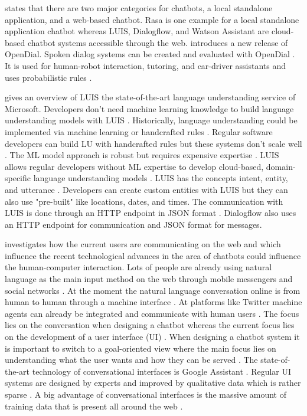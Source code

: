 \citet{kane2016role} states that there are two major categories for chatbots, a local standalone application, 
and a web-based chatbot. Rasa is one example for a local standalone application chatbot whereas LUIS, 
Dialogflow, and Watson Assistant are cloud-based chatbot systems accessible through the web.
\citet{lison2016opendial} introduces a new release of OpenDial. Spoken dialog systems can be 
created and evaluated with OpenDial \cite{lison2016opendial}. It is used for human-robot interaction, 
tutoring, and car-driver assistants and uses probabilistic rules \cite{lison2016opendial}.

\citet{luis2015williams} gives an overview of LUIS the state-of-the-art language understanding service of Microsoft.
Developers don't need machine learning knowledge to build language understanding models with LUIS \cite{luis2015williams}.
Historically, language understanding could be implemented via machine learning or handcrafted rules \cite{luis2015williams}.
Regular software developers can build LU with handcrafted rules but these systems don't scale well \cite{luis2015williams}.
The ML model approach is robust but requires expensive expertise \cite{luis2015williams}. 
LUIS allows regular developers without ML expertise to develop cloud-based, domain-specific language 
understanding models \cite{luis2015williams}.
LUIS has the concepts intent, entity, and utterance \cite{luis2015williams}.
Developers can create custom entities with LUIS but they can also use "pre-built" like locations, dates, and times.
The communication with LUIS is done through an HTTP endpoint in JSON format \cite{luis2015williams}. 
Dialogflow also uses an HTTP endpoint for communication and JSON format for messages. 

\citet{folstad2017chatbots} investigates how the current users are communicating on the web and which influence 
the recent technological advances in the area of chatbots could influence the human-computer interaction.
Lots of people are already using natural language as the main input method on the web through mobile messengers 
and social networks \cite{folstad2017chatbots}. At the moment the natural language conversation online is from 
human to human through a machine interface \cite{folstad2017chatbots}. 
At platforms like Twitter machine agents can already be integrated and communicate with human users \cite{folstad2017chatbots}. 
The focus lies on the conversation when designing a chatbot whereas the current focus lies on the 
development of a user interface (UI) \cite{folstad2017chatbots}.
When designing a chatbot system it is important to switch to a goal-oriented view where the main focus 
lies on understanding what the user wants and how they can be served \cite{folstad2017chatbots}.
The state-of-the-art technology of conversational interfaces is Google Assistant \cite{folstad2017chatbots}.
Regular UI systems are designed by experts and improved by qualitative data which is rather sparse \cite{folstad2017chatbots}.
A big advantage of conversational interfaces is the massive amount of training data that is present all around the web \cite{folstad2017chatbots}. 

